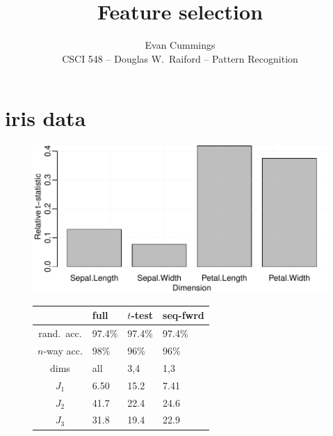 


\footnotesize

\title{Feature selection}
\author{Evan Cummings\\
CSCI 548 -- Douglas W.~Raiford -- Pattern Recognition}

\maketitle

\section{iris data}

\begin{figure}[H]
  \begin{minipage}[b]{0.45\linewidth}
    \includegraphics[width=\linewidth]{images/iris_ttest.pdf}
  \end{minipage}
  \hfill
  \quad
  \begin{minipage}[b]{0.45\linewidth}
    \centering
    \begin{tabular}[b]{c|lll}
      & \textbf{full} & \textbf{$t$-test} & \textbf{seq-fwrd} \\
      \hline
      rand.~acc.   & 97.4\% & 97.4\% & 97.4\% \\ 
      $n$-way acc. & 98\%   & 96\%   & 96\% \\
      dims         & all    & 3,4    & 1,3 \\
      $J_1$        & 6.50   & 15.2   & 7.41 \\
      $J_2$        & 41.7   & 22.4   & 24.6 \\
      $J_3$        & 31.8   & 19.4   & 22.9 \\
    \end{tabular}
    \vspace{5mm}

\end{minipage}
\end{figure}
